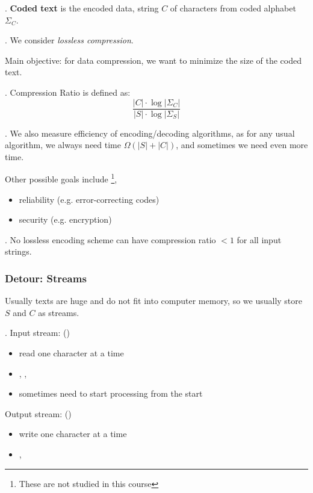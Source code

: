 \documentclass{article}
\begin{document}
\begin{deff}.
    \textbf{Coded text} is the encoded data, string $C$ of characters from coded alphabet $\Sigma_C$. 
\end{deff}

\begin{comm}[].
    We consider \textit{lossless compression}.  
\end{comm}

\begin{Question}{}
    Main objective: for data compression, we want to minimize the size of the coded text. 
\end{Question}

\begin{deff}.
    Compression Ratio is defined as: 
    \[ \frac{ |C| \cdot \log |\Sigma_C| }{ |S| \cdot \log |\Sigma_S| } \]
\end{deff}

\begin{discovery}[].
    We also measure  efficiency of encoding/decoding algorithms, as for any usual algorithm, we always need time $\Omega(|S| + |C|)$, and sometimes we need even more time. 
\end{discovery}

Other possible goals include \footnote{These are not studied in this course}, \begin{itemize}
    \item reliability (e.g. error-correcting codes)
    \item security (e.g. encryption)
\end{itemize} 

\begin{discovery}[].
    No lossless encoding scheme can have compression ratio $< 1$ for all input strings. 
\end{discovery}

\subsubsection{Detour: Streams}

Usually texts are huge and do not fit into computer memory, so we usually store $S$ and $C$ as streams. 

\begin{codes}[].
    Input stream: () \begin{itemize}
        \item read one character at a time
        \item {}, ,  
        \item sometimes need  to start processing from the start
    \end{itemize} 
    Output stream: () \begin{itemize}
        \item write one character at a time 
        \item {},  
    \end{itemize}
\end{codes}
\end{document}
